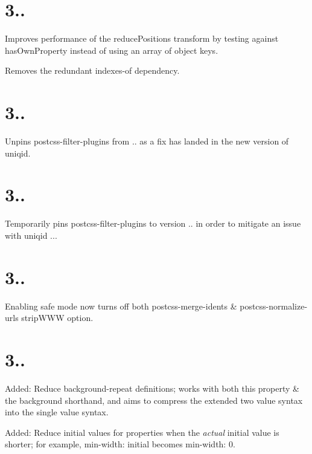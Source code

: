\section*{3..}


\begin{DoxyItemize}
\item Improves performance of the reduce\+Positions transform by testing against {\ttfamily has\+Own\+Property} instead of using an array of object keys.
\item Removes the redundant {\ttfamily indexes-\/of} dependency.
\end{DoxyItemize}

\section*{3..}


\begin{DoxyItemize}
\item Unpins postcss-\/filter-\/plugins from {..} as a fix has landed in the new version of uniqid.
\end{DoxyItemize}

\section*{3..}


\begin{DoxyItemize}
\item Temporarily pins postcss-\/filter-\/plugins to version {..} in order to mitigate an issue with uniqid {..}.
\end{DoxyItemize}

\section*{3..}


\begin{DoxyItemize}
\item Enabling safe mode now turns off both postcss-\/merge-\/idents \& postcss-\/normalize-\/url\textquotesingle{}s {\ttfamily strip\+W\+WW} option.
\end{DoxyItemize}

\section*{3..}


\begin{DoxyItemize}
\item Added\+: Reduce {\ttfamily background-\/repeat} definitions; works with both this property \& the {\ttfamily background} shorthand, and aims to compress the extended two value syntax into the single value syntax.
\item Added\+: Reduce {\ttfamily initial} values for properties when the {\itshape actual} initial value is shorter; for example, {\ttfamily min-\/width\+: initial} becomes {\ttfamily min-\/width\+: 0}.
\end{DoxyItemize}

